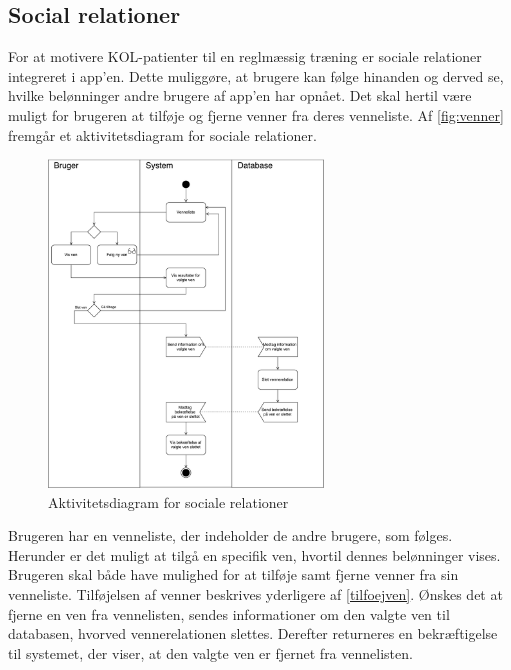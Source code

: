 \subsection{Social relationer} 
For at motivere KOL-patienter til en reglmæssig træning er sociale relationer integreret i app'en. Dette muliggøre, at brugere kan følge hinanden og derved se, hvilke belønninger andre brugere af app'en har opnået. Det skal hertil være muligt for brugeren at tilføje og fjerne venner fra deres venneliste. Af \autoref{fig:venner} fremgår et aktivitetsdiagram for sociale relationer. 

\begin{figure} [H]
\centering
\includegraphics[width=0.65\textwidth]{figures/aktivitetsdiagram/venner}
\caption{Aktivitetsdiagram for sociale relationer}
\label{fig:venner}
\end{figure}

\noindent
Brugeren har en venneliste, der indeholder de andre brugere, som følges. Herunder er det muligt at tilgå en specifik ven, hvortil dennes belønninger vises. Brugeren skal både have mulighed for at tilføje samt fjerne venner fra sin venneliste. Tilføjelsen af venner beskrives yderligere af \autoref{tilfoejven}. Ønskes det at fjerne en ven fra vennelisten, sendes informationer om den valgte ven til databasen, hvorved vennerelationen slettes. Derefter returneres en bekræftigelse til systemet, der viser, at den valgte ven er fjernet fra vennelisten. 

